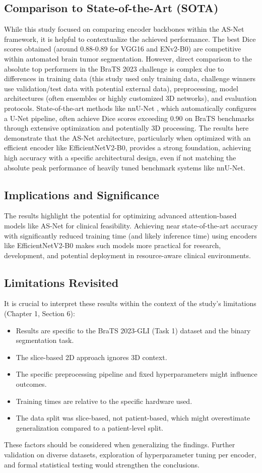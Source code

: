 \subsection{Comparison to State-of-the-Art (SOTA)}
While this study focused on comparing encoder backbones within the AS-Net framework, it is helpful to contextualize the achieved performance. The best Dice scores obtained (around 0.88-0.89 for VGG16 and ENv2-B0) are competitive within automated brain tumor segmentation. However, direct comparison to the absolute top performers in the BraTS 2023 challenge is complex due to differences in training data (this study used only training data, challenge winners use validation/test data with potential external data), preprocessing, model architectures (often ensembles or highly customized 3D networks), and evaluation protocols. State-of-the-art methods like nnU-Net \parencite{isensee2021nnu}, which automatically configures a U-Net pipeline, often achieve Dice scores exceeding 0.90 on BraTS benchmarks through extensive optimization and potentially 3D processing. The results here demonstrate that the AS-Net architecture, particularly when optimized with an efficient encoder like EfficientNetV2-B0, provides a strong foundation, achieving high accuracy with a specific architectural design, even if not matching the absolute peak performance of heavily tuned benchmark systems like nnU-Net.

\subsection{Implications and Significance}
The results highlight the potential for optimizing advanced attention-based models like AS-Net for clinical feasibility. Achieving near state-of-the-art accuracy with significantly reduced training time (and likely inference time) using encoders like EfficientNetV2-B0 makes such models more practical for research, development, and potential deployment in resource-aware clinical environments.

\subsection{Limitations Revisited}
It is crucial to interpret these results within the context of the study's limitations (Chapter 1, Section 6):
\begin{itemize}
  \item Results are specific to the BraTS 2023-GLI (Task 1) dataset and the binary segmentation task.
  \item The slice-based 2D approach ignores 3D context.
  \item The specific preprocessing pipeline and fixed hyperparameters might influence outcomes.
  \item Training times are relative to the specific hardware used.
  \item The data split was slice-based, not patient-based, which might overestimate generalization compared to a patient-level split.
\end{itemize}
These factors should be considered when generalizing the findings. Further validation on diverse datasets, exploration of hyperparameter tuning per encoder, and formal statistical testing would strengthen the conclusions.